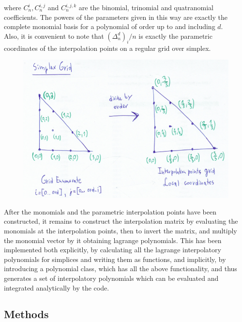 \documentclass[12pt]{article}
\begin{document}
\noindent
where $C^{i}_n, C^{i,j}_n$ and $C^{i,j,k}_n$ are the binomial, trinomial and quatranomial coefficients. The powers of the parameters given in this way are exactly the complete monomial basis for a polynomial of order up to and including $d$. \\

\noindent
Also, it is convenient to note that $(\Delta^{d}_n)_i / n$ is exactly the parametric coordinates of the interpolation points on a regular grid over simplex. 

\begin{figure}[hp]
    \centering
    \includegraphics[scale=0.5]{doc-pics/pic-simplex-grid.png}
\end{figure}

\noindent
After the monomials and the parametric interpolation points have been constructed, it remains to construct the interpolation matrix by evaluating the monomials at the interpolation points, then to invert the matrix, and multiply the monomial vector by it obtaining lagrange polynomials. This has been implemented both explicitly, by calculating all the lagrange interpolatory polynomials for simplices and writing them as functions, and implicitly, by introducing a polynomial class, which has all the above functionality, and thus generates a set of interpolatory polynomials which can be evaluated and integrated analytically by the code.

\subsection{Methods}
\end{document}
